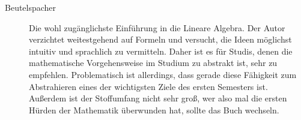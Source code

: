 \begin{description}
\item[Beutelspacher]{
Die wohl zugänglichste Einführung in die Lineare Algebra. Der Autor
verzichtet weitestgehend auf Formeln und versucht, die Ideen möglichst
intuitiv und sprachlich zu vermitteln. Daher ist es für Studis, denen
die
mathematische Vorgehensweise im Studium zu abstrakt ist, sehr zu
empfehlen.
Problematisch ist allerdings, dass gerade diese Fähigkeit zum
Abstrahieren eines der wichtigsten Ziele des ersten Semesters ist.
Außerdem ist der Stoffumfang nicht sehr
groß, wer also mal die ersten Hürden der Mathematik überwunden hat,
sollte
das Buch wechseln.}







\end{description}
